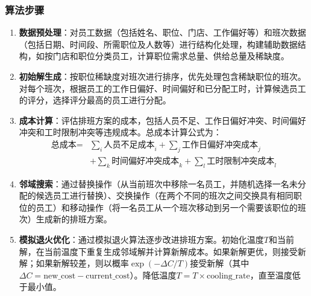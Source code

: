 \documentclass{ctexart}
\begin{document}
\subsubsection{算法步骤}
\begin{enumerate}
    \item \textbf{数据预处理}：对员工数据（包括姓名、职位、门店、工作偏好等）和班次数据（包括日期、时间段、所需职位及人数等）进行结构化处理，构建辅助数据结构，如按门店和职位分类员工，计算职位需求总量、供给总量及稀缺度。
    
    \item \textbf{初始解生成}：按职位稀缺度对班次进行排序，优先处理包含稀缺职位的班次。对每个班次，根据员工的工作日偏好、时间偏好和已分配工时，计算候选员工的评分，选择评分最高的员工进行分配。
    
    \item \textbf{成本计算}：评估排班方案的成本，包括人员不足、工作日偏好冲突、时间偏好冲突和工时限制冲突等违规成本。总成本计算公式为：
    \begin{equation}
    \begin{split}
    \text{总成本} = & \sum_{i} \text{人员不足成本}_i + \sum_{j} \text{工作日偏好冲突成本}_j \\
                   & + \sum_{k} \text{时间偏好冲突成本}_k + \sum_{l} \text{工时限制冲突成本}_l
    \end{split}
    \end{equation}
    
    \item \textbf{邻域搜索}：通过替换操作（从当前班次中移除一名员工，并随机选择一名未分配的候选员工进行替换）、交换操作（在两个不同的班次之间交换具有相同职位的员工）和移动操作（将一名员工从一个班次移动到另一个需要该职位的班次）生成新的排班方案。
    
    \item \textbf{模拟退火优化}：通过模拟退火算法逐步改进排班方案。初始化温度$T$和当前解，在当前温度下重复生成邻域解并计算新解成本。如果新解更优，则接受新解；如果新解较差，则以概率$\exp(-\Delta C / T)$接受新解（其中$\Delta C = \text{new\_cost} - \text{current\_cost}$）。降低温度$T = T \times \text{cooling\_rate}$，直至温度低于最小值。
\end{enumerate}
\end{document}
